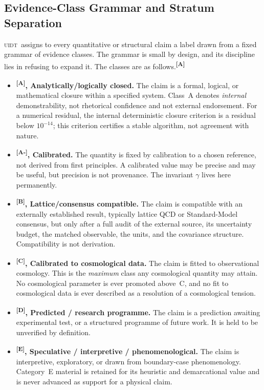 \documentclass[12pt,a4paper,twoside]{article}
\theoremstyle{plain}
\theoremstyle{definition}
\theoremstyle{remark}
\newcommand{\UIDT}{\textsc{uidt}}
\newcommand{\catmark}[1]{\textsuperscript{\textsf{\textbf{[#1]}}}}
\begin{document}
\subsection{Evidence-Class Grammar and Stratum Separation}
\label{subsec:evidence-grammar}

\UIDT\ assigns to every quantitative or structural claim a label drawn from a fixed grammar of evidence classes. The grammar is small by design, and its discipline lies in refusing to expand it. The classes are as follows.\catmark{A}

\begin{itemize}[leftmargin=2.2em]
 \item \textbf{\catmark{A}, Analytically/logically closed.} The claim is a formal, logical, or mathematical closure within a specified system. Class~A denotes \emph{internal} demonstrability, not rhetorical confidence and not external endorsement. For a numerical residual, the internal deterministic closure criterion is a residual below $10^{-14}$; this criterion certifies a stable algorithm, not agreement with nature. \item \textbf{\catmark{A-}, Calibrated.} The quantity is fixed by calibration to a chosen reference, not derived from first principles. A calibrated value may be precise and may be useful, but precision is not provenance. The invariant $\gamma$ lives here permanently.
 \newpage
 \item \textbf{\catmark{B}, Lattice/consensus compatible.} The claim is compatible with an externally established result, typically lattice QCD or Standard-Model consensus, but only after a full audit of the external source, its uncertainty budget, the matched observable, the units, and the covariance structure. Compatibility is not derivation. \item \textbf{\catmark{C}, Calibrated to cosmological data.} The claim is fitted to observational cosmology. This is the \emph{maximum} class any cosmological quantity may attain. No cosmological parameter is ever promoted above~C, and no fit to cosmological data is ever described as a resolution of a cosmological tension. \item \textbf{\catmark{D}, Predicted / research programme.} The claim is a prediction awaiting experimental test, or a structured programme of future work. It is held to be unverified by definition. \item \textbf{\catmark{E}, Speculative / interpretive / phenomenological.} The claim is interpretive, exploratory, or drawn from boundary-case phenomenology. Category~E material is retained for its heuristic and demarcational value and is never advanced as support for a physical claim.
\end{itemize}
\end{document}
